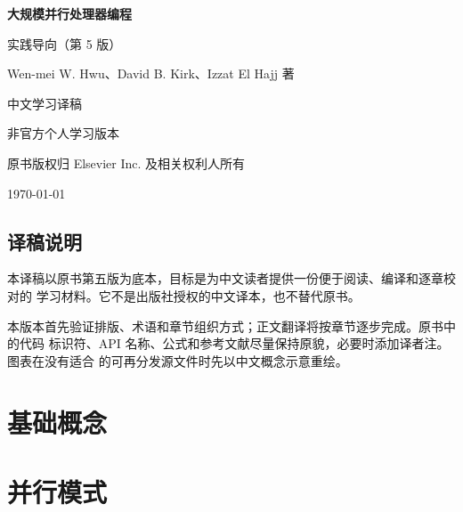 \documentclass[UTF8,zihao=-4,openany,fontset=fandol]{ctexbook}
\begin{document}
\frontmatter

\begin{titlepage}
  \centering
  \vspace*{2.5cm}
  {\Huge\bfseries 大规模并行处理器编程\par}
  \vspace{0.6cm}
  {\Large 实践导向（第 5 版）\par}
  \vspace{1.4cm}
  {\large Wen-mei W. Hwu、David B. Kirk、Izzat El Hajj 著\par}
  \vspace{1.2cm}
  {\Large 中文学习译稿\par}
  \vfill
  {\large 非官方个人学习版本\par}
  \vspace{0.5cm}
  {\small 原书版权归 Elsevier Inc. 及相关权利人所有\par}
  \vspace{0.8cm}
  {\small \today\par}
\end{titlepage}

\chapter*{译稿说明}

本译稿以原书第五版为底本，目标是为中文读者提供一份便于阅读、编译和逐章校对的
学习材料。它不是出版社授权的中文译本，也不替代原书。

本版本首先验证排版、术语和章节组织方式；正文翻译将按章节逐步完成。原书中的代码
标识符、API 名称、公式和参考文献尽量保持原貌，必要时添加译者注。图表在没有适合
的可再分发源文件时先以中文概念示意重绘。

\tableofcontents

\mainmatter



\part{基础概念}






\part{并行模式}









\end{document}
